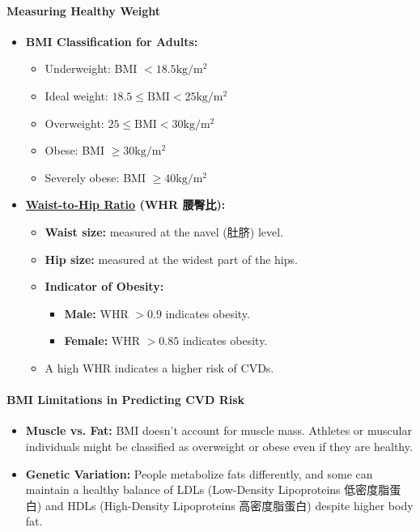 \paragraph{Measuring Healthy Weight}
\begin{itemize}
    \item \textbf{BMI Classification for Adults:}
    \begin{itemize}
        \item Underweight: BMI $< 18.5 \text{kg}/\text{m}^2$
        \item Ideal weight: $18.5 \leq \text{BMI} < 25 \text{kg}/\text{m}^2$
        \item Overweight: $25 \leq \text{BMI} < 30 \text{kg}/\text{m}^2$
        \item Obese: BMI $\geq 30 \text{kg}/\text{m}^2$
        \item Severely obese: BMI $\geq 40 \text{kg}/\text{m}^2$
    \end{itemize}
    \item \textbf{\underline{Waist-to-Hip Ratio} (WHR 腰臀比):}
    \begin{itemize}
        \item \textbf{Waist size:} measured at the navel (肚脐) level.
        \item \textbf{Hip size:} measured at the widest part of the hips.
        \item \textbf{Indicator of Obesity:}
        \begin{itemize}
            \item \textbf{Male:} WHR $> 0.9$ indicates obesity.
            \item \textbf{Female:} WHR $> 0.85$ indicates obesity.
        \end{itemize}
        \item A high WHR indicates a higher risk of CVDs.
    \end{itemize}
\end{itemize}

\paragraph{BMI Limitations in Predicting CVD Risk}
\begin{itemize}
    \item \textbf{Muscle vs. Fat:} BMI doesn't account for muscle mass. Athletes or muscular individuals might be classified as
    overweight or obese even if they are healthy.
    \item \textbf{Genetic Variation:} People metabolize fats differently, and some can maintain a healthy balance of LDLs
    (Low-Density Lipoproteins 低密度脂蛋白) and HDLs (High-Density Lipoproteins 高密度脂蛋白) despite higher body fat.
\end{itemize}

